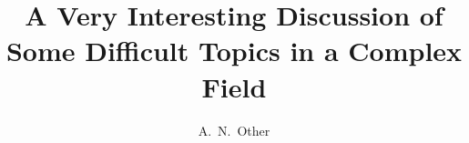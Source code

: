 \documentclass[a4paper,oneside,12pt]{RJWThesis}
\begin{document}
\begin{frontmatter}
\title{A Very Interesting Discussion of Some Difficult
  Topics in a Complex Field}
\author{A.\ N.\ Other}
\maketitle

\tableofcontents
\end{frontmatter}

\begin{mainmatter}

\end{mainmatter}
\end{document}
